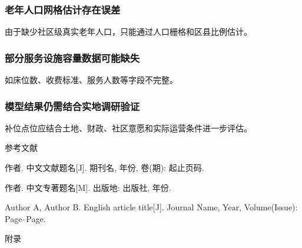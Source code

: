 \documentclass[UTF8,zihao=-4,a4paper,fontset=none]{ctexart}
\newcommand{\FZhei}{\CJKfamily{hei}}
\begin{document}
\subsubsection{老年人口网格估计存在误差}

由于缺少社区级真实老年人口，只能通过人口栅格和区县比例估计。

\subsubsection{部分服务设施容量数据可能缺失}

如床位数、收费标准、服务人数等字段不完整。

\subsubsection{模型结果仍需结合实地调研验证}

补位点位应结合土地、财政、社区意愿和实际运营条件进一步评估。

\clearpage
{}
{}

\begin{center}
    {\FZhei{}\setlength{\baselineskip}{24pt}\selectfont 参考文献\par}
\end{center}

\begin{enumerate}[label={\textnormal{[\arabic*]}},leftmargin=2em]
    \item 作者. 中文文献题名[J]. 期刊名, 年份, 卷(期): 起止页码.
    \item 作者. 中文专著题名[M]. 出版地: 出版社, 年份.
    \item Author A, Author B. English article title[J]. Journal Name, Year, Volume(Issue): Page--Page.
\end{enumerate}

\clearpage
{}
{}

\begin{center}
    {\FZhei{}\setlength{\baselineskip}{24pt}\selectfont 附录\par}
\end{center}
\end{document}
